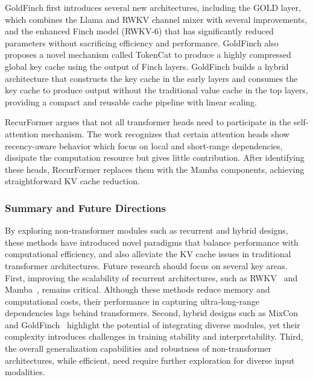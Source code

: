 GoldFinch \cite{goldsteinGoldFinchHighPerformance2024} first introduces several new architectures, including the GOLD layer, which combines the Llama and RWKV channel mixer with several improvements, and the enhanced Finch model (RWKV-6) that has significantly reduced parameters without sacrificing efficiency and performance. GoldFinch also proposes a novel mechanism called TokenCat to produce a highly compressed global key cache using the output of Finch layers. GoldFinch builds a hybrid architecture that constructs the key cache in the early layers and consumes the key cache to produce output without the traditional value cache in the top layers, providing a compact and reusable cache pipeline with linear scaling.


RecurFormer \cite{yanRecurFormerNotAll2024} argues that not all transformer heads need to participate in the self-attention mechanism. The work recognizes that certain attention heads show recency-aware behavior which focus on local and short-range dependencies, dissipate the computation resource but gives little contribution. After identifying these heads, RecurFormer replaces them with the Mamba components, achieving straightforward KV cache reduction.


\subsubsection{Summary and Future Directions} 
By exploring non-transformer modules such as recurrent and hybrid designs, these methods have introduced novel paradigms that balance performance with computational efficiency, and also alleviate the KV cache issues in traditional transformer architectures. Future research should focus on several key areas. First, improving the scalability of recurrent architectures, such as RWKV~\cite{pengRWKVReinventingRNNs2023} and Mamba~\cite{guMambaLinearTimeSequence2024}, remains critical. Although these methods reduce memory and computational costs, their performance in capturing ultra-long-range dependencies lags behind transformers. Second, hybrid designs such as MixCon~\cite{xuMixConHybridArchitecture2024} and GoldFinch~\cite{goldsteinGoldFinchHighPerformance2024} highlight the potential of integrating diverse modules, yet their complexity introduces challenges in training stability and interpretability. Third, the overall generalization capabilities and robustness of non-transformer architectures, while efficient, need require further exploration for diverse input modalities.


